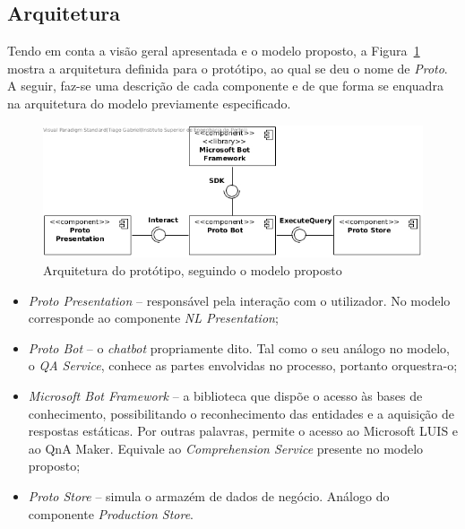 \subsection{Arquitetura}
Tendo em conta a visão geral apresentada e o modelo proposto, a Figura~\ref{fig:prototype_architecture} mostra a arquitetura definida para o protótipo, ao qual se deu o nome de \textit{Proto}. A seguir, faz-se uma descrição de cada componente e de que forma se enquadra na arquitetura do modelo previamente especificado.
%
\begin{figure}[!ht]
    \centering
    \includegraphics[width=.75\textwidth]{ch05/assets/prototype-architecture.jpg}
    \caption{Arquitetura do protótipo, seguindo o modelo proposto}
    \label{fig:prototype_architecture}
\end{figure}
%
\begin{itemize}
    \item
    {
        \textit{Proto Presentation} -- responsável pela interação com o utilizador. No modelo corresponde ao componente \textit{NL Presentation};
    }
    \item
    {
        \textit{Proto Bot} -- o \textit{chatbot} propriamente dito. Tal como o seu análogo no modelo, o \textit{QA Service}, conhece as partes envolvidas no processo, portanto orquestra-o;
    }
    \item
    {
        \textit{Microsoft Bot Framework} -- a biblioteca que dispõe o acesso às bases de conhecimento, possibilitando o reconhecimento das entidades e a aquisição de respostas estáticas. Por outras palavras, permite o acesso ao Microsoft LUIS e ao QnA Maker. Equivale ao \textit{Comprehension Service} presente no modelo proposto;
    }
    \item
    {
        \textit{Proto Store} -- simula o armazém de dados de negócio. Análogo do componente \textit{Production Store}.
    }
\end{itemize}

